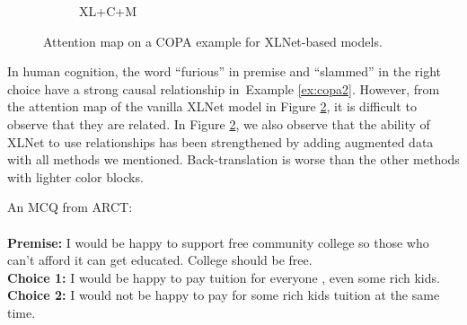 \documentclass[runningheads]{llncs}
\newcommand{\figref}[1]{Figure \ref{#1}}
\newcommand{\exref}[1]{Example \ref{#1}}
\newcommand{\KZ}[1]{\textcolor{blue}{Kenny: #1}}
\newcommand{\crosssymbol}{{\color{red} \XSolidBrush} }
\newcommand{\checksymbol}{{\color{green} \Checkmark} }
\begin{document}
\begin{figure}[th!]
\begin{subfigure}[b]{0.40\textwidth}
\caption{XL+C+M}
\label{fig:copa2_cm}
\end{subfigure}
\caption{Attention map on a COPA example for XLNet-based models.}
\label{fig:copa2_bert}
\end{figure}

In human cognition, the word ``furious'' in premise and ``slammed'' in the right choice 
have a strong causal relationship in~\exref{ex:copa2}. 
However, from the attention map of the vanilla XLNet model in \figref{fig:copa2_bert}, 
it is difficult to observe that they are related. 
In \figref{fig:copa2_bert}, we also observe that 
the ability of XLNet to use relationships has been strengthened by adding augmented data with all 
methods we mentioned. Back-translation is worse than the other methods with lighter color blocks.

\begin{example}\label{ex:arct1}
An MCQ from ARCT:\\ \\
\noindent
\textbf{Premise:} I would be happy to support free community college so those who can't afford it can get educated. College should be free.\\
\textbf{Choice 1:} I would be happy to pay tuition for everyone , even some rich kids.  \checksymbol \\
\textbf{Choice 2:} I would not be happy to pay for some rich kids tuition at the same time. \crosssymbol
\end{example}
\end{document}
